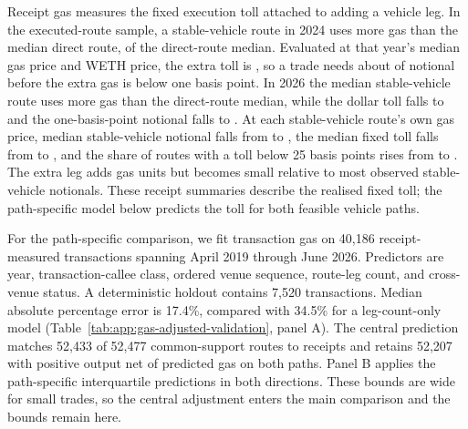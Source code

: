 Receipt gas measures the fixed execution toll attached to adding a vehicle leg. In the executed-route sample, a stable-vehicle route in 2024 uses \GasStableExtraGasUnitsBase{} more gas than the median direct route, \GasStableExtraGasPctBase{} of the direct-route median. Evaluated at that year's median gas price and WETH price, the extra toll is \GasStableExtraCostBase{}, so a trade needs about \GasStableOneBpNotionalBase{} of notional before the extra gas is below one basis point. In 2026 the median stable-vehicle route uses \GasStableExtraGasUnitsEnd{} more gas than the direct-route median, while the dollar toll falls to \GasStableExtraCostEnd{} and the one-basis-point notional falls to \GasStableOneBpNotionalEnd{}. At each stable-vehicle route's own gas price, median stable-vehicle notional falls from \GasStableRouteMedianNotionalBase{} to \GasStableRouteMedianNotionalEnd{}, the median fixed toll falls from \GasStableRouteMedianTollBpsBase{} to \GasStableRouteMedianTollBpsEnd{}, and the share of routes with a toll below 25 basis points rises from \GasStableRouteTwentyFiveBpShareBase{} to \GasStableRouteTwentyFiveBpShareEnd{}. The extra leg adds gas units but becomes small relative to most observed stable-vehicle notionals. These receipt summaries describe the realised fixed toll; the path-specific model below predicts the toll for both feasible vehicle paths.

For the path-specific comparison, we fit transaction gas on 40,186 receipt-measured transactions spanning April 2019 through June 2026. Predictors are year, transaction-callee class, ordered venue sequence, route-leg count, and cross-venue status. A deterministic holdout contains 7,520 transactions. Median absolute percentage error is 17.4\%, compared with 34.5\% for a leg-count-only model (Table~\ref{tab:app:gas-adjusted-validation}, panel A). The central prediction matches 52,433 of 52,477 common-support routes to receipts and retains 52,207 with positive output net of predicted gas on both paths. Panel B applies the path-specific interquartile predictions in both directions. These bounds are wide for small trades, so the central adjustment enters the main comparison and the bounds remain here.

